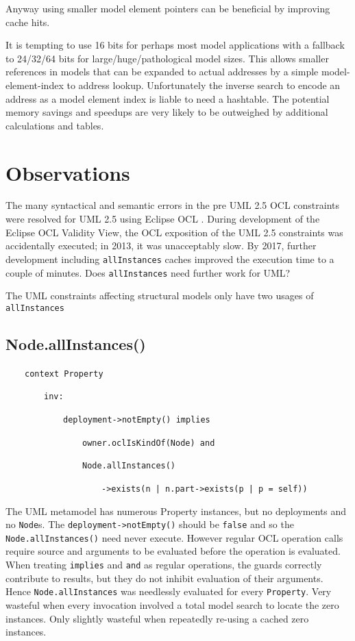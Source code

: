 \documentclass[
]{ceurart}
\begin{document}
Anyway using smaller model element pointers can be beneficial by improving cache hits.

It is tempting to use 16 bits for perhaps most model applications with a fallback to 24/32/64 bits for large/huge/pathological model sizes. This allows smaller references in models that can be expanded to actual addresses by a simple model-element-index to address lookup. Unfortunately the inverse search to encode an address as a model element index is liable to need a hashtable. The potential memory savings and speedups are very likely to be outweighed by additional calculations and tables.

\section{Observations}\label{Observations}

The many syntactical and semantic errors \cite{wilke2011uml} in the pre UML 2.5 OCL constraints were resolved for UML 2.5 using Eclipse OCL \cite{Eclipse-OCL}. During development of the Eclipse OCL Validity View, the OCL exposition of the UML 2.5 constraints was accidentally executed; in 2013, it was unacceptably slow. By 2017, further development including \verb!allInstances! caches improved the execution time to a couple of minutes. Does \verb!allInstances! need further work for UML?

The UML constraints affecting structural models only have two usages of \verb!allInstances!

\subsection{Node.allInstances()}

\begin{description}[itemsep=-0.2cm]\small
\item ~~~~\verb!context Property!
\item ~~~~~~~~\verb!inv:!
\item ~~~~~~~~~~~~\verb!deployment->notEmpty() implies!
\item ~~~~~~~~~~~~~~~~\verb!owner.oclIsKindOf(Node) and!
\item ~~~~~~~~~~~~~~~~\verb!Node.allInstances()!
\item ~~~~~~~~~~~~~~~~~~~~\verb!->exists(n | n.part->exists(p | p = self))!
\end{description}

The UML metamodel has numerous Property instances, but no deployments and no \verb!Node!s. The \verb!deployment->notEmpty()! should be \verb!false! and so the \verb!Node.allInstances()! need never execute. However regular OCL operation calls require source and arguments to be evaluated before the operation is evaluated. When treating \verb!implies! and \verb!and! as regular operations, the guards correctly contribute to results, but they do not inhibit evaluation of their arguments. Hence \verb!Node.allInstances! was needlessly evaluated for every \verb!Property!. Very wasteful when every invocation involved a total model search to locate the zero instances. Only slightly wasteful when repeatedly re-using a cached zero instances. 
\end{document}
